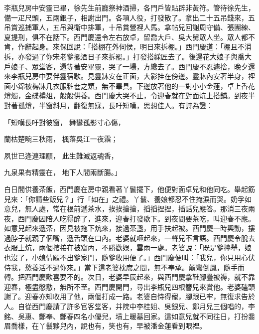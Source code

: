 \begin{showcontents}{}
李瓶兒房中安靈已畢，徐先生前廳祭神酒掃，各門戶皆貼辟非黃符。管待徐先生，備一疋尺頭，五兩銀子，相謝出門。各項人役，打發散了。拿出二十五吊錢來，五吊賞巡捕軍人，五吊與衛中排軍，十吊賞營裡人馬。拿帖兒回謝周守備、張團練、夏提刑，俱不在話下。西門慶還令左右放卓，留喬大戶、吳大舅眾人坐。眾人都不肯，作辭起身。來保回說：「搭棚在外伺侯，明日來拆棚。」西門慶道：「棚且不消拆，亦發過了你宋老爹擺酒日子來拆罷。」打發搭綵匠去了。後邊花大娘子與喬大戶娘子、眾堂客，還等著安畢靈，哭了一場，方纔去了。西門慶不忍遽捨，晚夕還來李瓶兒房中要伴靈宿歇。見靈牀安在正面，大影挂在傍邊。靈牀內安著半身，裡面小錦被褥牀几衣服粧奩之類，無不畢具。下邊放著他的一對小小金蓮，卓上香花燈燭，金碟樽俎，般般供養。西門慶大哭不止，令迎春就在對面炕上搭鋪。到夜半對著孤燈，半窗斜月，翻復無寐，長吁短嘆，思想佳人。有詩為證：

「短嘆長吁對彼窗，  舞鸞孤影寸心傷，

蘭枯楚畹三秋雨，  楓落吳江一夜霜；

夙世已逢連理願，  此生難滅返魂香，

九泉果有精靈在，  地下人間兩斷腸。」

白日間供養茶飯，西門慶在房中親看著丫鬟擺下，他便對面卓兒和他同吃。舉起筯兒來：「你請些飯兒？」行「如在」之禮。丫鬟、養娘都忍不住掩淚而哭。奶孚如意兒，無人處，常在根前遞茶水，挨挨搶搶，搯搯捏捏，插話兒應答。那消三夜兩夜，西門慶因陪人吃得醉了，進來，迎春打發歇下。到夜間要茶吃，叫迎春不應。如意兒起來遞茶，因見被拖下炕來，接過茶盞，用手扶起被。西門慶一時興動，摟過脖子就親了個嘴，遞舌頭在口內。老婆就咂起來，一聲兒不言語。西門慶令脫去衣服上炕，兩個摟接在被窩內，不勝歡娛，雲雨一處。老婆說：「既是爹擡舉，娘也沒了，小媳情願不出爹家門，隨爹收用便了。」西門慶便叫：「我兒，你只用心伏侍我，愁養活不過你來。」當下這老婆枕席之間，無不奉承。顛鸞倒鳳，隨手而轉。把西門慶歡喜要不的。次日，老婆早辰起來，與西門慶拿鞋腳疊被褥，就不靠迎春，極盡慇懃，無所不至。西門慶開門，尋出李瓶兒四根簪兒來賞他。老婆磕頭謝了。迎春亦知收用了他，兩個打成一路。老婆自恃得寵，腳跟已牢，無復求告於人。自從西門慶請了許多官客堂客，并院中李桂姐、吳銀兒、鄭月兒三個唱的，李銘、吳惠、鄭奉、鄭春四名小優兒，墳上暖墓回家。這如意兒就不同往日，打扮喬眉喬樣，在丫鬟夥兒內，說也有，笑也有，早被潘金蓮看到眼裡。


\end{showcontents}
